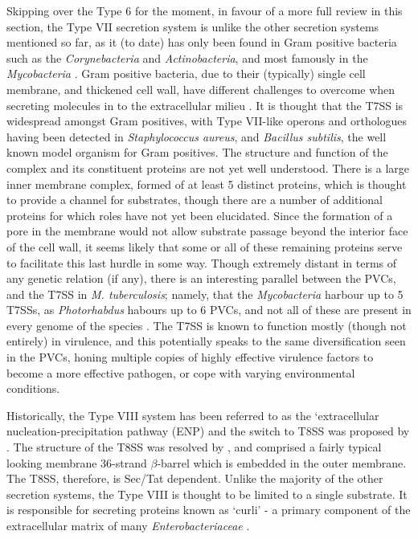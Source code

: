 Skipping over the Type 6 for the moment, in favour of a more full review in this section, the Type VII secretion system is unlike the other secretion systems mentioned so far, as it (to date) has only been found in Gram positive bacteria such as the \emph{Corynebacteria} and \emph{Actinobacteria}, and most famously in the \emph{Mycobacteria} \citep{Ates2016}. Gram positive bacteria, due to their (typically) single cell membrane, and thickened cell wall, have different challenges to overcome when secreting molecules in to the extracellular milieu \citep{Green2015}. It is thought that the T7SS is widespread amongst Gram positives, with Type VII-like operons and orthologues having been detected in \emph{Staphylococcus aureus}, and \emph{Bacillus subtilis}, the well known model organism for Gram positives. The structure and function of the complex and its constituent proteins are not yet well understood. There is a large inner membrane complex, formed of at least 5 distinct proteins, which is thought to provide a channel for substrates, though there are a number of additional proteins for which roles have not yet been elucidated. Since the formation of a pore in the membrane would not allow substrate passage beyond the interior face of the cell wall, it seems likely that some or all of these remaining proteins serve to facilitate this last hurdle in some way. Though extremely distant in terms of any genetic relation (if any), there is an interesting parallel between the PVCs, and the T7SS in \emph{M. tuberculosis}; namely, that the \emph{Mycobacteria} harbour up to 5 T7SSs, as \emph{Photorhabdus} habours up to 6 PVCs, and not all of these are present in every genome of the species \citep{Bottai2017}. The T7SS is known to function mostly (though not entirely) in virulence, and this potentially speaks to the same diversification seen in the PVCs, honing multiple copies of highly effective virulence factors to become a more effective pathogen, or cope with varying environmental conditions.

Historically, the Type VIII system has been referred to as the `extracellular nucleation-precipitation pathway (ENP) and the switch to T8SS was proposed by \cite{Desvaux2009}. The structure of the T8SS was resolved by \cite{Goyal2014}, and comprised a fairly typical looking membrane 36-strand $\beta$-barrel which is embedded in the outer membrane. The T8SS, therefore, is Sec/Tat dependent. Unlike the majority of the other secretion systems, the Type VIII is thought to be limited to a single substrate. It is responsible for secreting proteins known as `curli' - a primary component of the extracellular matrix of many \emph{Enterobacteriaceae} \citep{Barnhart2010}.

